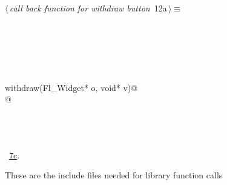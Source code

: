 \documentclass{article}
\renewcommand{\NWtarget}[2]{\hypertarget{#1}{#2}}
\renewcommand{\NWlink}[2]{\hyperlink{#1}{#2}}
\begin{document}
\begin{flushleft} \small
\begin{minipage}{\linewidth}\label{scrap17}\raggedright\small
\NWtarget{nuweb12a}{} $\langle\,${\it call back function for withdraw button}\nobreak\ {\footnotesize {12a}}$\,\rangle\equiv$
\vspace{-1ex}
\begin{list}{}{} \item
\mbox{}\verb@@\\
\mbox{}\verb@@\\
\mbox{}\verb@@\\
\mbox{}\verb@@\\
\mbox{}\verb@@\\
\mbox{}\verb@void withdraw(Fl_Widget* o, void* v)@\\
\mbox{}@\\
\mbox{}\verb@@\\
\mbox{}\verb@@\\
\mbox{}\verb@@\\
\mbox{}\verb@@{\NWsep}
\end{list}
\vspace{-1.5ex}
\footnotesize
\begin{list}{}{\setlength{\itemsep}{-\parsep}\setlength{\itemindent}{-\leftmargin}}
\item \NWtxtMacroRefIn\ \NWlink{nuweb7c}{7c}.

\item{}
\end{list}
\end{minipage}\vspace{4ex}
\end{flushleft}
These are the include files needed for library function calls
\end{document}
